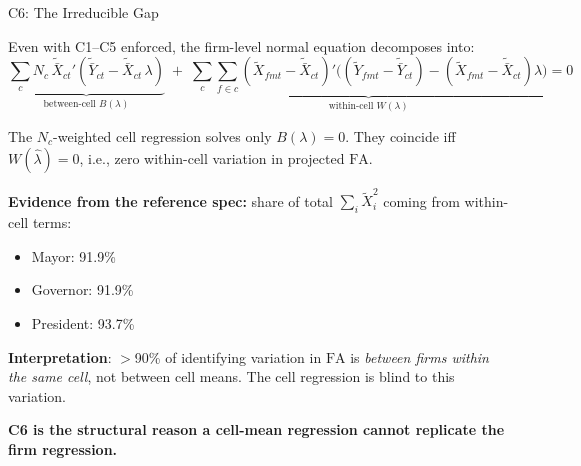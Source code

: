 \documentclass[aspectratio=169,11pt]{beamer}
\newcommand{\FA}{\mathrm{FA}}
\begin{document}
\begin{frame}{C6: The Irreducible Gap}

\footnotesize
Even with C1--C5 enforced, the firm-level normal equation decomposes into:
\[
  \underbrace{
    \sum_c N_c\, \tilde{\bar{X}}_{ct}'
    (\tilde{\bar{Y}}_{ct} - \tilde{\bar{X}}_{ct}\,\lambda)
  }_{\text{between-cell } B(\lambda)}
  \;+\;
  \underbrace{
    \sum_c \sum_{f \in c}
    (\tilde{X}_{fmt} - \tilde{\bar{X}}_{ct})'
    \bigl((\tilde{Y}_{fmt} - \tilde{\bar{Y}}_{ct})
    - (\tilde{X}_{fmt} - \tilde{\bar{X}}_{ct})\lambda\bigr)
  }_{\text{within-cell } W(\lambda)}
  = 0
\]

The $N_c$-weighted cell regression solves only $B(\lambda) = 0$.
They coincide iff $W(\hat\lambda) = 0$, i.e., zero within-cell variation in projected $\FA$.

\medskip
\textbf{Evidence from the reference spec:} share of total $\sum_i \tilde{X}_i^2$ coming from within-cell terms:
\begin{itemize}\setlength{\itemsep}{2pt}
  \item Mayor: 91.9\%
  \item Governor: 91.9\%
  \item President: 93.7\%
\end{itemize}

\medskip
\textbf{Interpretation}: $>$90\% of identifying variation in $\FA$ is \emph{between firms within the same cell}, not between cell means. The cell regression is blind to this variation.

\medskip
\centering
\textbf{C6 is the structural reason a cell-mean regression cannot replicate the firm regression.}

\end{frame}
\end{document}
